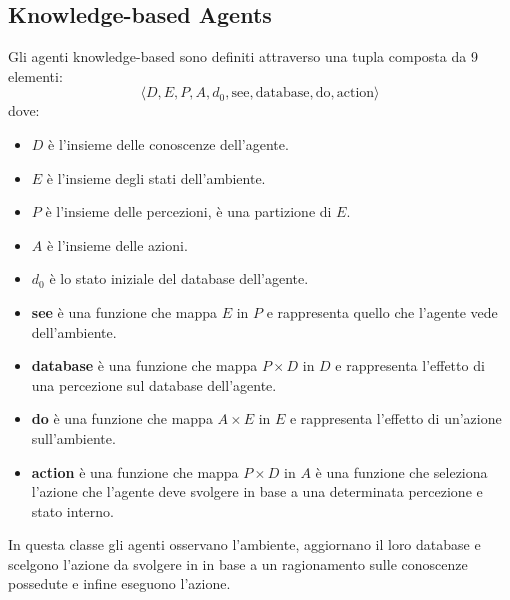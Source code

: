 \subsection{Knowledge-based Agents}
Gli agenti knowledge-based sono definiti attraverso una tupla composta da 9 elementi:
\begin{equation*}
    \langle D, E, P, A, d_0, \text{see}, \text{database}, \text{do}, \text{action} \rangle
\end{equation*}
dove:
\begin{itemize}
    \item $D$ è l'insieme delle conoscenze dell'agente.
    \item $E$ è l'insieme degli stati dell'ambiente.
    \item $P$ è l'insieme delle percezioni, è una partizione di $E$.
    \item $A$ è l'insieme delle azioni.
    \item $d_0$ è lo stato iniziale del database dell'agente.
    \item \textbf{see} è una funzione che mappa $E$ in $P$ e rappresenta quello
          che l'agente vede dell'ambiente.
    \item \textbf{database} è una funzione che mappa $P \times D$ in $D$ e
          rappresenta l'effetto di una percezione sul database dell'agente.
    \item \textbf{do} è una funzione che mappa $A \times E$ in $E$ e rappresenta
          l'effetto di un'azione sull'ambiente.
    \item \textbf{action} è una funzione che mappa $P \times D$ in $A$ è una funzione
          che seleziona l'azione che l'agente deve svolgere in base a una determinata
          percezione e stato interno.
\end{itemize}
In questa classe gli agenti osservano l'ambiente, aggiornano il loro database
e scelgono l'azione da svolgere in in base a un ragionamento sulle conoscenze
possedute e infine eseguono l'azione.
